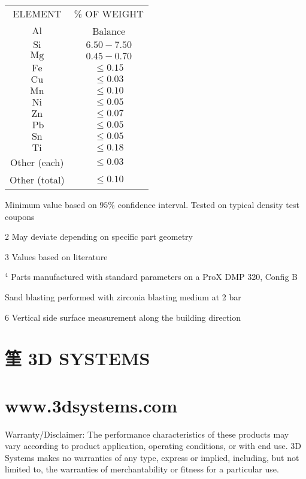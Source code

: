 \documentclass[10pt]{article}
\begin{document}
\begin{center}
\begin{tabular}{cc}
ELEMENT & \% OF WEIGHT \\
$\mathrm{Al}$ & Balance \\
$\mathrm{Si}$ & $6.50-7.50$ \\
$\mathrm{Mg}$ & $0.45-0.70$ \\
$\mathrm{Fe}$ & $\leq 0.15$ \\
$\mathrm{Cu}$ & $\leq 0.03$ \\
$\mathrm{Mn}$ & $\leq 0.10$ \\
$\mathrm{Ni}$ & $\leq 0.05$ \\
$\mathrm{Zn}$ & $\leq 0.07$ \\
$\mathrm{~Pb}$ & $\leq 0.05$ \\
$\mathrm{Sn}$ & $\leq 0.05$ \\
$\mathrm{Ti}$ & $\leq 0.18$ \\
Other (each) & $\leq 0.03$ \\
Other (total) & $\leq 0.10$ \\
\end{tabular}
\end{center}

Minimum value based on $95 \%$ confidence interval. Tested on typical density test coupons

2 May deviate depending on specific part geometry

3 Values based on literature

${ }^{4}$ Parts manufactured with standard parameters on a ProX DMP 320, Config B

Sand blasting performed with zirconia blasting medium at 2 bar

6 Vertical side surface measurement along the building direction

\section*{筀 3D SYSTEMS}
\section*{www.3dsystems.com}
Warranty/Disclaimer: The performance characteristics of these products may vary according to product application, operating conditions, or with end use. 3D Systems makes no warranties of any type, express or implied, including, but not limited to, the warranties of merchantability or fitness for a particular use.
\end{document}

